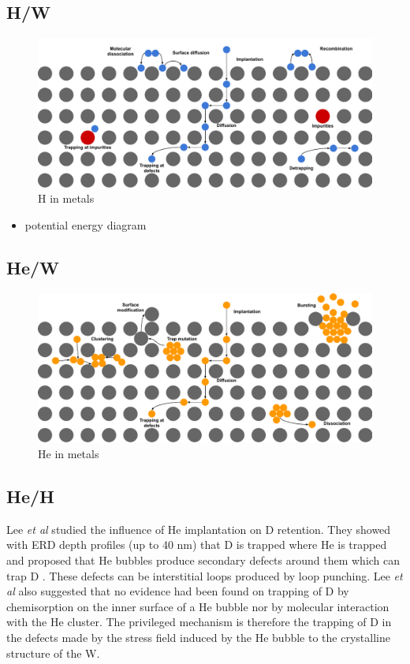 \subsection{H/W}
\begin{figure}
    \includegraphics[width=\linewidth]{Figures/Chapter1/HI transport sketch.pdf}
    \caption{H in metals}
\end{figure}

\begin{itemize}
    \item potential energy diagram
\end{itemize}
\subsection{He/W}

\begin{figure}
    \includegraphics[width=\linewidth]{Figures/Chapter1/He transport sketch.pdf}
    \caption{He in metals}
\end{figure}


\subsection{He/H}
Lee \textit{et al} studied the influence of He implantation on D retention.
They showed with ERD depth profiles (up to 40 nm) that D is trapped where He is trapped and proposed that He bubbles produce secondary defects around them which can trap D \cite{lee_hydrogen_2007}.
These defects can be interstitial loops produced by loop punching.
Lee \textit{et al} also suggested that no evidence had been found on trapping of D by chemisorption on the inner surface of a He bubble nor by molecular interaction with the He cluster.
The privileged mechanism is therefore the trapping of D in the defects made by the stress field induced by the He bubble to the crystalline structure of the W.

